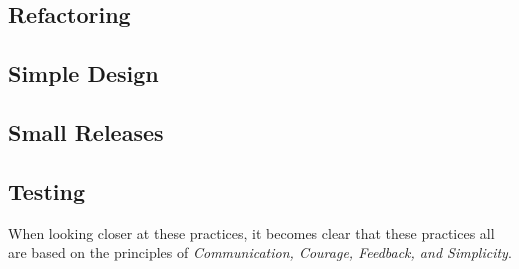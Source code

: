 



\subsection{Refactoring}






\subsection{Simple Design}






\subsection{Small Releases}






\subsection{Testing}








When looking closer at these practices, it becomes clear that these practices all are based on the principles of \textit{Communication, Courage, Feedback, and Simplicity}.